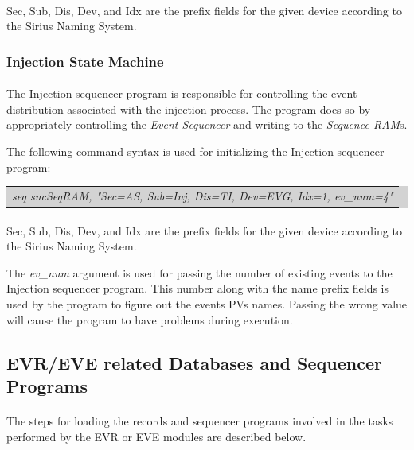 \documentclass[openany]{article}
\begin{document}
			\paragraph{} Sec, Sub, Dis, Dev, and Idx are the prefix fields for the given device according to the Sirius Naming System.
		\subsubsection{Injection State Machine}

			\paragraph{} The Injection sequencer program is responsible for controlling the event distribution associated with the injection process. The program does so by appropriately controlling the \emph{Event Sequencer} and writing to the \emph{Sequence RAM}s.
			\par The following command syntax is used for initializing the Injection sequencer program:

			\bigskip
			\colorbox{lightgray}{
				\begin{tabularx}{0.9\textwidth}{X}
				\emph{seq sncSeqRAM, "Sec=AS, Sub=Inj, Dis=TI, Dev=EVG, Idx=1, ev\_num=4"}
				\end{tabularx}
			}

			\paragraph{} Sec, Sub, Dis, Dev, and Idx are the prefix fields for the given device according to the Sirius Naming System.
			\par The \emph{ev\_num} argument is used for passing the number of existing events to the Injection sequencer program. This number along with the name prefix fields is used by the program to figure out the events PVs names. Passing the wrong value will cause the program to have problems during execution.

	\subsection{EVR/EVE related Databases and Sequencer Programs}

		\paragraph{} The steps for loading the records and sequencer programs involved in the tasks performed by the EVR or EVE modules are described below.
\end{document}
